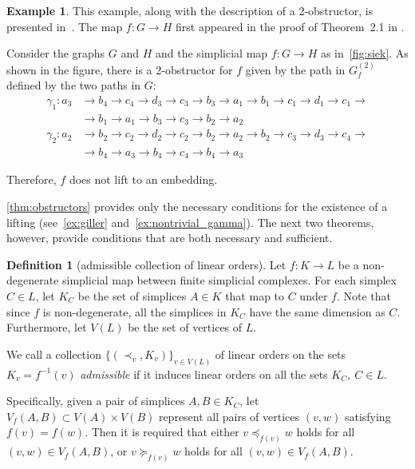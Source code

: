 \documentclass[a4paper,12pt,reqno,oneside]{amsart}
\theoremstyle{plain}
\theoremstyle{definition}
\newtheorem*{definition}{Definition}
\newtheorem{example}{Example}
\theoremstyle{plain}
\newcommand{\from}{\colon}
\begin{document}
\begin{example}\label{ex:siek}
  This example, along with the description of a 2-obstructor, is presented in~\cite[\S
  3.1]{akh_rep_skop}. The map $f \from G \to H$ first appeared in the proof of Theorem~2.1 in
  \cite{siek}.

  Consider the graphs $G$ and $H$ and the simplicial map $f \from G \to H$ as in~\cref{fig:siek}. As
  shown in the figure, there is a 2-obstructor for $f$ given by the path in $G^{(2)}_f$ defined by
  the two paths in $G$:
  \[
    \begin{aligned}
      \gamma_1 \from a_3 &\to b_4 \to c_4 \to d_3 \to c_3 \to b_3 \to a_1 \to b_1 \to c_1 \to d_1 \to
      c_1 \to \\ &\to b_1 \to a_1 \to b_3 \to c_3 \to b_2 \to a_2 \\
      \gamma_2 \from a_2 &\to b_2 \to c_2 \to d_2 \to c_2 \to b_2 \to a_2 \to b_2 \to c_3 \to d_3
      \to c_4 \to \\ &\to b_4 \to a_3 \to b_4 \to c_4 \to b_4 \to a_3
    \end{aligned}
  \]

  Therefore, $f$ does not lift to an embedding.
\end{example}

\cref{thm:obstructors} provides only the necessary conditions for the existence of a lifting
(see~\cref{ex:giller} and~\cref{ex:nontrivial_gamma}). The next two theorems, however, provide
conditions that are both necessary and sufficient.

\begin{definition}[admissible collection of linear orders]
  Let $f \from K \to L$ be a non-degenerate simplicial map between finite simplicial complexes. For
  each simplex $C \in L$, let $K_C$ be the set of simplices $A \in K$ that map to $C$ under
  $f$. Note that since $f$ is non-degenerate, all the simplices in $K_C$ have the same dimension as
  $C$. Furthermore, let $V(L)$ be the set of vertices of $L$.

  We call a collection $\{ (\prec_v, K_v) \}_{v \in V(L)}$ of linear orders on the sets
  $K_v = f^{-1}(v)$ \emph{admissible} if it induces
  linear orders on all the sets $K_C,\ C \in L$.

  Specifically, given a pair of simplices $A, B \in K_C$, let $V_{f}(A, B) \subset V(A) \times V(B)$
  represent all pairs of vertices $(v, w)$ satisfying $f(v) = f(w)$. Then it is required that either
  $v \preceq_{f(v)} w$ holds for all $(v, w) \in V_{f}(A, B)$, or $v \succeq_{f(v)} w$ holds for all
  $(v, w) \in V_{f}(A, B)$.
\end{definition}
\end{document}
